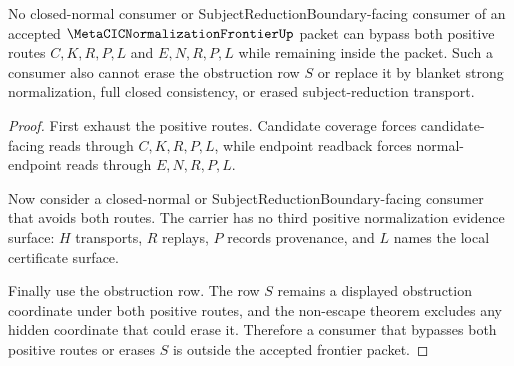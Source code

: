 \begin{theorem}
\label{thm:metacic-normalization-frontier-consumer-nonescape}
No closed-normal consumer or SubjectReductionBoundary-facing consumer of an accepted $\MetaCICNormalizationFrontierUp$ packet can bypass both positive routes $C,K,R,P,L$ and $E,N,R,P,L$ while remaining inside the packet. Such a consumer also cannot erase the obstruction row $S$ or replace it by blanket strong normalization, full closed consistency, or erased subject-reduction transport.
\end{theorem}
\begin{proof}
First exhaust the positive routes. Candidate coverage forces candidate-facing reads through $C,K,R,P,L$, while endpoint readback forces normal-endpoint reads through $E,N,R,P,L$.

Now consider a closed-normal or SubjectReductionBoundary-facing consumer that avoids both routes. The carrier has no third positive normalization evidence surface: $H$ transports, $R$ replays, $P$ records provenance, and $L$ names the local certificate surface.

Finally use the obstruction row. The row $S$ remains a displayed obstruction coordinate under both positive routes, and the non-escape theorem excludes any hidden coordinate that could erase it. Therefore a consumer that bypasses both positive routes or erases $S$ is outside the accepted frontier packet.
\end{proof}

